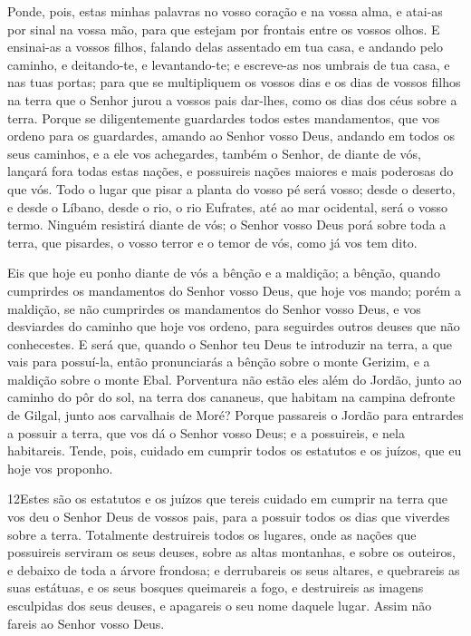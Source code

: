 Ponde, pois, estas minhas palavras no vosso coração e na vossa
alma, e atai-as por sinal na vossa mão, para que estejam por
frontais entre os vossos olhos. E ensinai-as a vossos filhos,
falando delas assentado em tua casa, e andando pelo caminho, e
deitando-te, e levantando-te; e escreve-as nos umbrais de tua
casa, e nas tuas portas; para que se multipliquem os vossos
dias e os dias de vossos filhos na terra que o Senhor jurou a vossos
pais dar-lhes, como os dias dos céus sobre a terra. Porque se
diligentemente guardardes todos estes mandamentos, que vos ordeno
para os guardardes, amando ao Senhor vosso Deus, andando em todos os
seus caminhos, e a ele vos achegardes, também o Senhor, de
diante de vós, lançará fora todas estas nações, e possuireis nações
maiores e mais poderosas do que vós. Todo o lugar que pisar a
planta do vosso pé será vosso; desde o deserto, e desde o Líbano,
desde o rio, o rio Eufrates, até ao mar ocidental, será o vosso
termo. Ninguém resistirá diante de vós; o Senhor vosso Deus
porá sobre toda a terra, que pisardes, o vosso terror e o temor de
vós, como já vos tem dito.

Eis que hoje eu ponho diante de vós a bênção e a maldição;
a bênção, quando cumprirdes os mandamentos do Senhor vosso
Deus, que hoje vos mando; porém a maldição, se não cumprirdes
os mandamentos do Senhor vosso Deus, e vos desviardes do caminho que
hoje vos ordeno, para seguirdes outros deuses que não conhecestes.
E será que, quando o Senhor teu Deus te introduzir na terra,
a que vais para possuí-la, então pronunciarás a bênção sobre o monte
Gerizim, e a maldição sobre o monte Ebal. Porventura não
estão eles além do Jordão, junto ao caminho do pôr do sol, na terra
dos cananeus, que habitam na campina defronte de Gilgal, junto aos
carvalhais de Moré? Porque passareis o Jordão para entrardes
a possuir a terra, que vos dá o Senhor vosso Deus; e a possuireis, e
nela habitareis. Tende, pois, cuidado em cumprir todos os
estatutos e os juízos, que eu hoje vos proponho.

\medskip

\lettrine{12} Estes são os estatutos e os juízos que tereis
cuidado em cumprir na terra que vos deu o Senhor Deus de vossos
pais, para a possuir todos os dias que viverdes sobre a terra.
Totalmente destruireis todos os lugares, onde as nações que
possuireis serviram os seus deuses, sobre as altas montanhas, e
sobre os outeiros, e debaixo de toda a árvore frondosa; e
derrubareis os seus altares, e quebrareis as suas estátuas, e os
seus bosques queimareis a fogo, e destruireis as imagens esculpidas
dos seus deuses, e apagareis o seu nome daquele lugar. Assim não
fareis ao Senhor vosso Deus.

